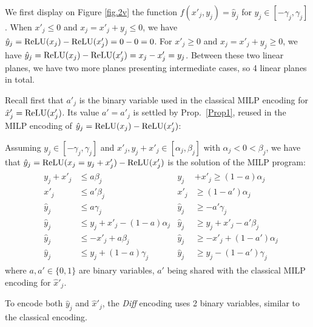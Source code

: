 We first display on Figure \ref{fig.2v} the function $f(x'_j,y_j)=\hat{y}_j$ for $y_j \in [- \gamma_j, \gamma_j]$. 
	When $x'_j \leq 0$ and $x_j = x'_j+y_j \leq 0$, we have $\hat{y}_j = \mathrm{ReLU}(x_j) - \mathrm{ReLU}(x'_j) = 0-0=0$. For $x'_j \geq 0$ and $x_j = x'_j+y_j \geq 0$, we have $\hat{y}_j= \mathrm{ReLU}(x_j)-\mathrm{ReLU}(x'_j)=x_j - x'_j = y_j$. 
    Between these two linear planes, we have two more planes presenting intermediate cases, so 4 linear planes in total.
	

Recall first that $a'_j$ is the binary variable used in the 
classical MILP encoding for $\hat{x}'_j=\mathrm{ReLU}(x'_j)$.
Its value $a'=a'_j$ is settled by Prop.~\ref{Prop1},
reused in the MILP encoding of $\hat{y}_j = \mathrm{ReLU}(x_j)-\mathrm{ReLU}(x'_j)$:


\begin{proposition}
    \label{Prop2}
Assuming $y_j \in [-\gamma_j, \gamma_j]$ and $x'_j,y_j+x'_j \in [\alpha_j,\beta_j]$ with  $\alpha_j<0<\beta_j$, we have that $\hat{y}_j = \mathrm{ReLU}(x_j=y_j + x'_j) - \mathrm{ReLU}(x'_j)$ is the solution of the MILP program:
	\begin{align*}
		& \begin{aligned}
			y_j + x'_j &\leq a\beta_j        &
			y_j &+ x'_j \geq (1-a)\alpha_j \\
			x'_j       &\leq a'\beta_j       & 
			x'_j       &\geq (1-a')\alpha_j \\
			\hat{y}_j  &\leq a\gamma_j       &
			\hat{y}_j  &\geq -a'\gamma_j \\
			\hat{y}_j  &\leq y_j + x'_j - (1-a)\alpha_j &
			\hat{y}_j  &\geq y_j + x'_j - a'\beta_j \\
			\hat{y}_j  &\leq -x'_j + a\beta_j &
			\hat{y}_j  &\geq -x'_j + (1-a')\alpha_j \\
			\hat{y}_j  &\leq y_j + (1-a)\gamma_j  &
			\hat{y}_j  &\geq y_j - (1-a')\gamma_j
		\end{aligned}
	\end{align*} 
    where $a,a' \in \{0,1\}$ are binary variables, 
    $a'$ being shared with the classical MILP
    encoding for $\hat{x}'_j$.
\end{proposition}

To encode both $\hat{y}_j$ and $\hat{x}'_j$, the {\em Diff} encoding uses 2 binary variables, similar to the classical encoding.

